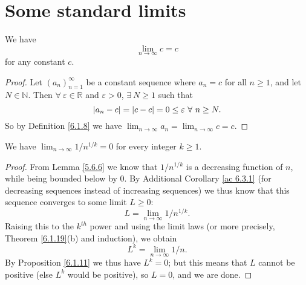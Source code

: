 \section{Some standard limits}\label{sec 6.5}

\begin{additional corollary}\label{ac 6.5.1}
We have
\[
    \lim_{n \to \infty} c = c
\]
for any constant \(c\).
\end{additional corollary}

\begin{proof}
Let \((a_n)_{n = 1}^\infty\) be a constant sequence where \(a_n = c\) for all \(n \geq 1\), and let \(N \in \mathds{N}\).
Then \(\forall\ \varepsilon \in \mathds{R}\) and \(\varepsilon > 0\), \(\exists\ N \geq 1\) such that
\[
    \abs*{a_n - c} = \abs*{c - c} = 0 \leq \varepsilon \ \forall \ n \geq N.
\]
So by Definition \ref{6.1.8} we have \(\lim_{n \to \infty} a_n = \lim_{n \to \infty} c = c\).
\end{proof}

\begin{corollary}\label{6.5.1}
We have \(\lim_{n \to \infty} 1 / n^{1 / k} = 0\) for every integer \(k \geq 1\).
\end{corollary}

\begin{proof}
From Lemma \ref{5.6.6} we know that \(1 / n^{1 / k}\) is a decreasing function of \(n\), while being bounded below by \(0\).
By Additional Corollary \ref{ac 6.3.1} (for decreasing sequences instead of increasing sequences) we thus know that this sequence converges to some limit \(L \geq 0\):
\[
    L = \lim_{n \to \infty} 1 / n^{1 / k}.
\]
Raising this to the \(k^{th}\) power and using the limit laws (or more precisely, Theorem \ref{6.1.19}(b) and induction), we obtain
\[
    L^k = \lim_{n \to \infty} 1 / n.
\]
By Proposition \ref{6.1.11} we thus have \(L^k = 0\);
but this means that \(L\) cannot be positive (else \(L^k\) would be positive), so \(L = 0\), and we are done.
\end{proof}